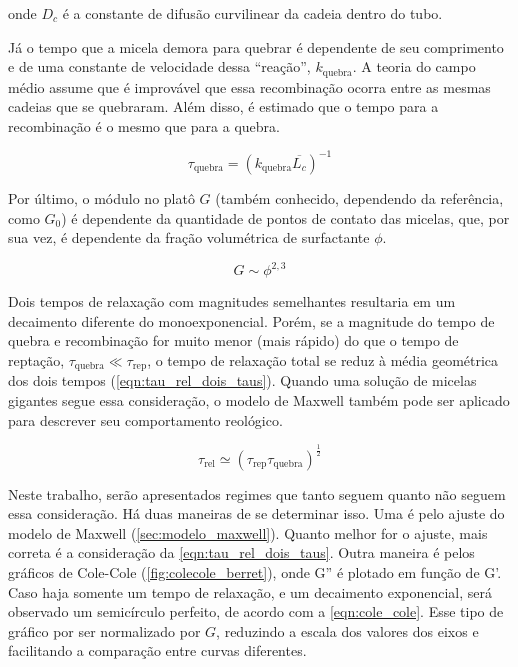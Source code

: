 		\noindent onde \(D_c\) é a constante de difusão curvilinear da cadeia dentro do tubo.
		
		Já o tempo que a micela demora para quebrar é dependente de seu comprimento e de uma constante de velocidade dessa ``reação'', \(k_\mathrm{quebra}\).\cite{Cates1990} A teoria do campo médio assume que é improvável que essa recombinação ocorra entre as mesmas cadeias que se quebraram. Além disso, é estimado que o tempo para a recombinação é o mesmo que para a quebra. 
		
		\begin{equation}
			\tau_{\mathrm{quebra}} = \left(k_\mathrm{quebra}\overline{L_c}\right)^{-1}
			\label{eqn:tempo_quebra_comp_contorno}
		\end{equation} %
		
		Por último, o módulo no platô \(G\) (também conhecido, dependendo da referência, como \(G_0\))  é dependente da quantidade de pontos de contato das micelas, que, por sua vez, é dependente da fração volumétrica de surfactante \(\phi\).\cite{Cates1990} 
		
		\begin{equation}
			G \sim \phi^{2{,}3}  
			\label{eqn:scaling_g0}
		\end{equation} %
		
		Dois tempos de relaxação com magnitudes semelhantes resultaria em um decaimento diferente do monoexponencial. Porém, se a magnitude do tempo de quebra e recombinação for muito menor (mais rápido) do que o tempo de reptação, \( \tau_{\mathrm{quebra}} \ll \tau_\mathrm{rep} \), o tempo de relaxação total se reduz à média geométrica dos dois tempos (\autoref{eqn:tau_rel_dois_taus}). Quando uma solução de micelas gigantes segue essa consideração, o modelo de Maxwell também pode ser aplicado para descrever seu comportamento reológico.\cite{Berret1993a}
		
		\begin{equation}
			\tau_{\mathrm{rel}} \simeq \left( \tau_\mathrm{rep} \tau_\mathrm{quebra} \right) ^ \frac{1}{2}
			\label{eqn:tau_rel_dois_taus}
		\end{equation} 
		
		Neste trabalho, serão apresentados regimes que tanto seguem quanto não seguem essa consideração. Há duas maneiras de se determinar isso. Uma é pelo ajuste do modelo de Maxwell (\autoref{sec:modelo_maxwell}). Quanto melhor for o ajuste, mais correta é a consideração da \autoref{eqn:tau_rel_dois_taus}. Outra maneira é pelos gráficos de Cole-Cole (\autoref{fig:colecole_berret}), onde G'' é plotado em função de G'. Caso haja somente um tempo de relaxação, e um decaimento exponencial, será observado um semicírculo perfeito, de acordo com a \autoref{eqn:cole_cole}. Esse tipo de gráfico por ser normalizado por \(G\), reduzindo a escala dos valores dos eixos e facilitando a comparação entre curvas diferentes.\cite{Berret1993a}
		
